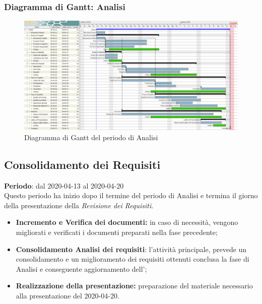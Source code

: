 	\subsubsection{Diagramma di Gantt: Analisi}
		\begin{figure}[h]
			\centering
			\includegraphics[width=1.1\textwidth]{./res/img/DiagrammiGantt/analisi_gantt.png}
			\caption{Diagramma di Gantt del periodo di Analisi}
		\end{figure}

\subsection{Consolidamento dei Requisiti}
\textbf{Periodo}: dal 2020-04-13 al 2020-04-20 \\
Questo periodo ha inizio dopo il termine del periodo di Analisi e termina il giorno della presentazione della \textit{Revisione dei Requisiti}. \\
\begin{itemize}
	\item \textbf{Incremento e Verifica dei documenti:} in caso di necessità, vengono migliorati e verificati i documenti preparati nella fase precedente;
	\item \textbf{Consolidamento Analisi dei requisiti}: l'attività principale, prevede un consolidamento e un miglioramento dei requisiti ottenuti conclusa la fase di Analisi e conseguente aggiornamento dell'\textit{\AdR{}};
	\item \textbf{Realizzazione della presentazione:} preparazione del materiale necessario alla presentazione del 2020-04-20.
\end{itemize}
